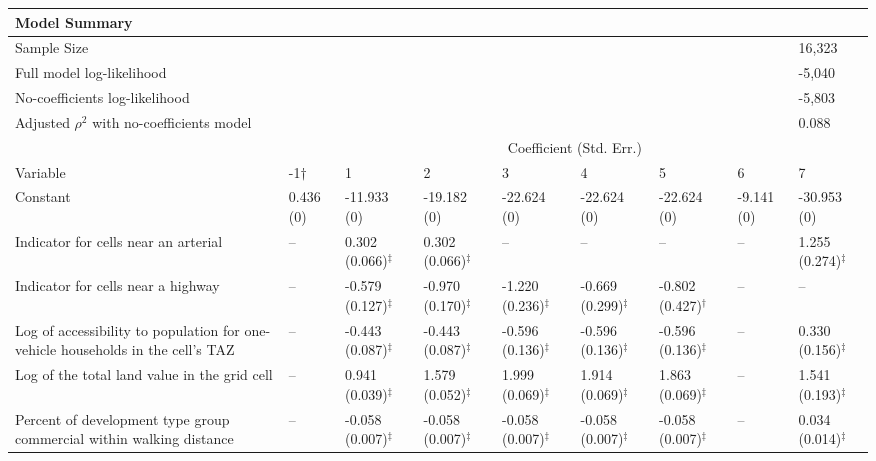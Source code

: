 
\begin{tabular}{p{3in}p{0.5in}p{0.5in}p{0.5in}p{0.5in}p{0.5in}p{0.5in}p{0.5in}p{0.5in}}
\toprule
    Model Summary & \\
\midrule
    Sample Size & & & & & & & & 16,323 \\
    Full model log-likelihood & & & & & & & & -5,040 \\
    No-coefficients log-likelihood & & & & & & & & -5,803 \\
    Adjusted $\rho^2$ with no-coefficients model & & & & & & & & 0.088 \\
\midrule
& \multicolumn{8}{c}{Coefficient (Std. Err.)}\\
\cmidrule{2-9}
 Variable    &   -1$\dagger$  &   1   &   2   &   3   &   4   &
5   &   6   &   7   \\
\midrule
Constant    &    0.436 (0)  &    -11.933 (0)    &    -19.182 (0)    &    -22.624 (0)    &    -22.624 (0)    &    -22.624 (0)    &    -9.141 (0)     &    -30.953 (0)    \\
Indicator for cells near an arterial    &    --     &    0.302 (0.066)$^{\ddagger}$     &    0.302 (0.066)$^{\ddagger}$     &    --     &    --     &    --     &    --     &    1.255 (0.274)$^{\ddagger}$     \\
Indicator for cells near a highway  &    --     &    -0.579 (0.127)$^{\ddagger}$    &    -0.970 (0.170)$^{\ddagger}$    &    -1.220 (0.236)$^{\ddagger}$    &    -0.669 (0.299)$^{\ddagger}$    &    -0.802 (0.427)$^{\dagger}$     &    --     &    --     \\
Log of accessibility to population for one-vehicle households in the cell's TAZ     &    --     &    -0.443 (0.087)$^{\ddagger}$    &    -0.443 (0.087)$^{\ddagger}$    &    -0.596 (0.136)$^{\ddagger}$    &    -0.596 (0.136)$^{\ddagger}$    &    -0.596 (0.136)$^{\ddagger}$    &    --     &    0.330 (0.156)$^{\ddagger}$     \\
Log of the total land value in the grid cell    &    --     &    0.941 (0.039)$^{\ddagger}$     &    1.579 (0.052)$^{\ddagger}$     &    1.999 (0.069)$^{\ddagger}$     &    1.914 (0.069)$^{\ddagger}$     &    1.863 (0.069)$^{\ddagger}$     &    --     &    1.541 (0.193)$^{\ddagger}$     \\
Percent of development type group commercial within walking distance    &    --     &    -0.058 (0.007)$^{\ddagger}$    &    -0.058 (0.007)$^{\ddagger}$    &    -0.058 (0.007)$^{\ddagger}$    &    -0.058 (0.007)$^{\ddagger}$    &    -0.058 (0.007)$^{\ddagger}$    &    --     &    0.034 (0.014)$^{\ddagger}$     \\

\end{tabular}
